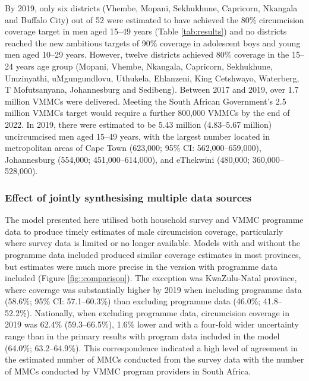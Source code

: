 \documentclass{article}
\begin{document}
By 2019, only six districts (Vhembe, Mopani, Sekhukhune, Capricorn, Nkangala and Buffalo City) out of 52 were estimated to have achieved the 80\% circumcision coverage target in men aged 15--49 years (Table \ref{tab:results}) and no districts reached the new ambitious targets of 90\% coverage in adolescent boys and young men aged 10--29 years. However, twelve districts achieved 80\% coverage in the 15--24 years age group (Mopani, Vhembe, Nkangala, Capricorn, Sekhukhune, Umzinyathi, uMgungundlovu, Uthukela, Ehlanzeni, King Cetshwayo, Waterberg, T Mofutsanyana, Johannesburg and Sedibeng). Between 2017 and 2019, over 1.7 million VMMCs were delivered. Meeting the South African Government's 2.5 million VMMCs target would require a further 800,000 VMMCs by the end of 2022. In 2019, there were estimated to be 5.43 million (4.83--5.67 million) uncircumcised men aged 15--49 years, with the largest number located in metropolitan areas of Cape Town (623,000; 95\% CI: 562,000--659,000), Johannesburg (554,000; 451,000--614,000), and eThekwini (480,000; 360,000--528,000).


\subsubsection*{Effect of jointly synthesising multiple data sources}



The model presented here utilised both household survey and VMMC programme data to produce timely estimates of male circumcision coverage, particularly where survey data is limited or no longer available. Models with and without the programme data included produced similar coverage estimates in most provinces, but estimates were much more precise in the version with programme data included (Figure \ref{fig::comparison}). The exception was KwaZulu-Natal province, where coverage was substantially higher by 2019 when including programme data (58.6\%; 95\% CI: 57.1--60.3\%) than excluding programme data (46.0\%; 41.8--52.2\%). Nationally, when excluding programme data, circumcision coverage in 2019 was 62.4\% (59.3--66.5\%), 1.6\% lower and with a four-fold wider uncertainty range than in the primary results with program data included in the model (64.0\%; 63.2--64.9\%). This correspondence indicated a high level of agreement in the estimated number of MMCs conducted from the survey data with the number of MMCs conducted by VMMC program providers in South Africa.
\end{document}
